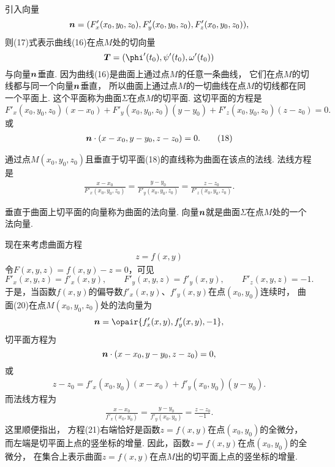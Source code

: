 引入向量\begin{equation}
	\boldsymbol{n}=(F'_x(x_0,y_0,z_0),F'_y(x_0,y_0,z_0),F'_z(x_0,y_0,z_0)),
\end{equation}
则(17)式表示曲线(16)在点\(M\)处的切向量\[
	\vb{T} = (\phi'(t_0),\psi'(t_0),\omega'(t_0))
\]与向量\(\boldsymbol{n}\)垂直.
因为曲线(16)是曲面上通过点\(M\)的任意一条曲线，
它们在点\(M\)的切线都与同一个向量\(\boldsymbol{n}\)垂直，
所以曲面上通过点\(M\)的一切曲线在点\(M\)的切线都在同一个平面上.
这个平面称为曲面\(\Sigma\)在点\(M\)的切平面.
这切平面的方程是\[
	F'_x(x_0,y_0,z_0) (x-x_0)
	+ F'_y(x_0,y_0,z_0) (y-y_0)
	+ F'_z(x_0,y_0,z_0) (z-z_0)
	= 0.
\]或\begin{gather}
	\boldsymbol{n}\cdot(x-x_0,y-y_0,z-z_0)=0.
	\tag{18}
\end{gather}

通过点\(M(x_0,y_0,z_0)\)且垂直于切平面(18)的直线称为曲面在该点的法线.
法线方程是\begin{gather}
	\frac{x-x_0}{F'_x(x_0,y_0,z_0)}
	=\frac{y-y_0}{F'_y(x_0,y_0,z_0)}
	=\frac{z-z_0}{F'_z(x_0,y_0,z_0)}.
	\tag{19}
\end{gather}

垂直于曲面上切平面的向量称为曲面的法向量.
向量\(\boldsymbol{n}\)就是曲面\(\Sigma\)在点\(M\)处的一个法向量.


现在来考虑曲面方程\begin{gather}
	z = f(x,y)
	\tag{20}
\end{gather}
令\(F(x,y,z)=f(x,y)-z=0\)，可见\[
	F'_x(x,y,z) = f'_x(x,y),
	\qquad
	F'_y(x,y,z) = f'_y(x,y),
	\qquad
	F'_z(x,y,z) = -1.
\]
于是，当函数\(f(x,y)\)的偏导数\(f'_x(x,y)\)、\(f'_y(x,y)\)在点\((x_0,y_0)\)连续时，
曲面(20)在点\(M(x_0,y_0,z_0)\)处的法向量为\[
	\vb{n}=\opair{f'_x(x,y),f'_y(x,y),-1},
\]
切平面方程为\[
	\boldsymbol{n}\cdot(x-x_0,y-y_0,z-z_0)=0,
\]或\begin{gather}
	z-z_0 = f'_x(x_0,y_0) (x-x_0) + f'_y(x_0,y_0) (y-y_0).
	\tag{21}
\end{gather}
而法线方程为\begin{gather}
	\frac{x-x_0}{f'_x(x_0,y_0)}
	=\frac{y-y_0}{f'_y(x_0,y_0)}
	=\frac{z-z_0}{-1}.
	\tag{22}
\end{gather}
这里顺便指出，
方程(21)右端恰好是函数\(z = f(x,y)\)在点\((x_0,y_0)\)的全微分，
而左端是切平面上点的竖坐标的增量.
因此，函数\(z = f(x,y)\)在点\((x_0,y_0)\)的全微分，
在集合上表示曲面\(z = f(x,y)\)在点\(M\)出的切平面上点的竖坐标的增量.

